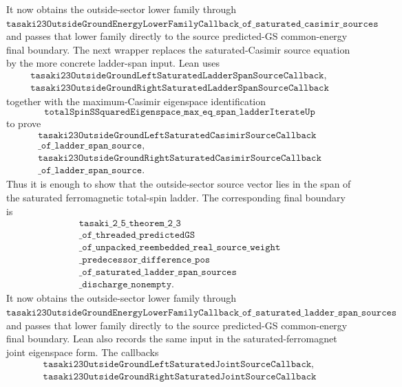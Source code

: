 \documentclass[a4paper,11pt]{article}
\begin{document}
It now obtains the outside-sector lower family through
\(\texttt{tasaki23OutsideGroundEnergyLowerFamilyCallback\_of\_saturated\_casimir\_sources}\)
and passes that lower family directly to the source predicted-GS common-energy
final boundary.
The next wrapper replaces the saturated-Casimir source equation by the
more concrete ladder-span input.  Lean uses
\[
\begin{gathered}
\texttt{tasaki23OutsideGroundLeftSaturatedLadderSpanSourceCallback},\\
\texttt{tasaki23OutsideGroundRightSaturatedLadderSpanSourceCallback}
\end{gathered}
\]
together with the maximum-Casimir eigenspace identification
\[
\texttt{totalSpinSSquaredEigenspace\_max\_eq\_span\_ladderIterateUp}
\]
to prove
\[
\begin{gathered}
\texttt{tasaki23OutsideGroundLeftSaturatedCasimirSourceCallback}\\
\texttt{\_of\_ladder\_span\_source},\\
\texttt{tasaki23OutsideGroundRightSaturatedCasimirSourceCallback}\\
\texttt{\_of\_ladder\_span\_source}.
\end{gathered}
\]
Thus it is enough to show that the outside-sector source vector lies in
the span of the saturated ferromagnetic total-spin ladder.  The
corresponding final boundary is
\[
\begin{gathered}
\texttt{tasaki\_2\_5\_theorem\_2\_3}\\
\texttt{\_of\_threaded\_predictedGS}\\
\texttt{\_of\_unpacked\_reembedded\_real\_source\_weight}\\
\texttt{\_predecessor\_difference\_pos}\\
\texttt{\_of\_saturated\_ladder\_span\_sources}\\
\texttt{\_discharge\_nonempty}.
\end{gathered}
\]
It now obtains the outside-sector lower family through
\(\texttt{tasaki23OutsideGroundEnergyLowerFamilyCallback\_of\_saturated\_ladder\_span\_sources}\)
and passes that lower family directly to the source predicted-GS common-energy
final boundary.
Lean also records the same input in the saturated-ferromagnet joint
eigenspace form.  The callbacks
\[
\begin{gathered}
\texttt{tasaki23OutsideGroundLeftSaturatedJointSourceCallback},\\
\texttt{tasaki23OutsideGroundRightSaturatedJointSourceCallback}
\end{gathered}
\]
\end{document}
